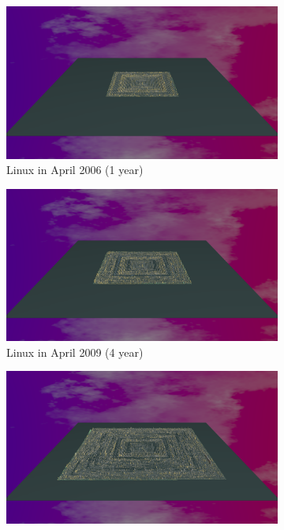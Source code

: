 \begin{figure}[ht]
    \begin{subfigure}{0.48\textwidth}
        \includegraphics[width=\linewidth]{Linux/Animation001.png}
        \caption{Linux in April 2006 (1 year)} 
        \label{fig:Linux_V7_S1}
    \end{subfigure}\hspace*{\fill}
    \begin{subfigure}{0.48\textwidth}
        \includegraphics[width=\linewidth]{Linux/Animation004.png}
        \caption{Linux in April 2009 (4 year)} 
        \label{fig:Linux_V7_S2}
    \end{subfigure}
    \medskip
    \begin{subfigure}{0.48\textwidth}
        \includegraphics[width=\linewidth]{Linux/Animation012.png}

\end{subfigure}
\end{figure}
